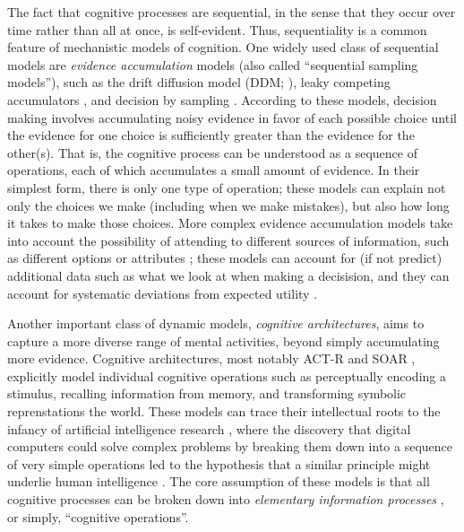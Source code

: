The fact that cognitive processes are sequential, in the sense that they occur over time rather than all at once, is self-evident. Thus, sequentiality is a common feature of mechanistic models of cognition. One widely used class of sequential models are \emph{evidence accumulation} models (also called ``sequential sampling models''), such as the drift diffusion model (DDM; \citealp{ratcliff1978theory}), leaky competing accumulators \citep{usher2001time}, and decision by sampling \citep{stewart2006decision}. According to these models, decision making involves accumulating noisy evidence in favor of each possible choice until the evidence for one choice is sufficiently greater than the evidence for the other(s). That is, the cognitive process can be understood as a sequence of operations, each of which accumulates a small amount of evidence. In their simplest form, there is only one type of operation; these models can explain not only the choices we make (including when we make mistakes), but also how long it takes to make those choices. More complex evidence accumulation models take into account the possibility of attending to different sources of information, such as different options \citep{krajbich2010visual} or attributes \citep{russo1983strategies}; these models can account for (if not predict) additional data such as what we look at when making a decisision, and they can account for systematic deviations from expected utility \citep{busemeyer2019cognitive}.

Another important class of dynamic models, \emph{cognitive architectures}, aims to capture a more diverse range of mental activities, beyond simply accumulating more evidence. Cognitive architectures, most notably ACT-R \citep{anderson1996act} and SOAR \citep{laird1987soar}, explicitly model individual cognitive operations such as perceptually encoding a stimulus, recalling information from memory, and transforming symbolic reprenstations the world. These models can trace their intellectual roots to the infancy of artificial intelligence research \citep{newell1956logic}, where the discovery that digital computers could solve complex problems by breaking them down into a sequence of very simple operations led to the hypothesis that a similar principle might underlie human intelligence \citep{newell1958elements,newell1972human}. The core assumption of these models is that all cognitive processes can be broken down into \emph{elementary information processes} \citep{simon1979information,posner1982information,chase1978elementary}, or simply, ``cognitive operations''.

